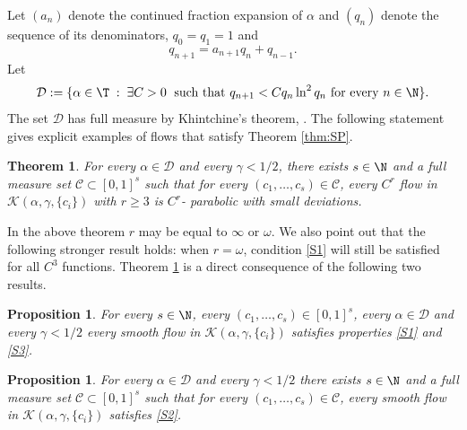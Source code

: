 \documentclass[10pt]{amsart}
\newcommand\cC{\mathcal{C}}
\newcommand\cD{\mathcal{D}}
\theoremstyle{definition}
\theoremstyle{plain}
\newtheorem{Main}{Theorem}
\newtheorem{proposition}[definition]{Proposition}
\begin{document}
Let $(a_n)$ denote the continued fraction expansion of $\alpha$ and $(q_n)$ denote the sequence of its denominators, \ie $q_0=q_1=1$ and
\begin{equation*}%
q_{n+1}=a_{n+1}q_n+q_{n-1}.
\end{equation*}
Let
\begin{equation}\label{eq:cp}
\cD:=\{\alpha\in \T\;:\;\exists C>0 \; \text{ such that }q_{n+1}<Cq_n \ln^2 q_n \text{ for every }n\in \N\}.
\end{equation}
The set $\cD$ has full measure by Khintchine's theorem, \cite[\S 13]{Khi}. The following statement
gives explicit examples of flows that satisfy Theorem \ref{thm:SP}.
\begin{Main}\label{prop:sch} For every $\alpha\in \cD$ and every $\gamma<1/2$, there exists $s\in \N$ and a full measure set $\cC\subset [0,1]^s$ such that for every $(c_1,\ldots, c_s)\in \cC$, every $C^r$ flow in $\mathcal{K}(\alpha,\gamma, \{c_i\})$
with $r\geq 3$ is $C^r$- parabolic with small deviations.
\end{Main}
In the above theorem $r$ may be equal to $\infty$ or $\omega$. We also point out that the following stronger result holds: when $r=\omega$, condition \eqref{S1} will still be satisfied for all $C^3$ functions.
Theorem \ref{prop:sch} is a direct consequence of the following two results.

\begin{proposition}\label{lem:sch2} For every $s\in \N$, every $(c_1,\ldots, c_s)\in [0,1]^s$, every $\alpha\in \cD$ and every $\gamma<1/2$ every smooth flow in $\mathcal{K}(\alpha,\gamma, \{c_i\})$ satisfies properties \eqref{S1} and \eqref{S3}.
\end{proposition}

\begin{proposition}\label{prop:sch2}
For every $\alpha\in \cD$ and every $\gamma<1/2$ there exists $s\in \N$ and a full measure set $\cC\subset [0,1]^s$ such that for every $(c_1,\ldots, c_s)\in \cC$, every smooth flow in $\mathcal{K}(\alpha,\gamma, \{c_i\})$ satisfies \eqref{S2}.
\end{proposition}
\end{document}
